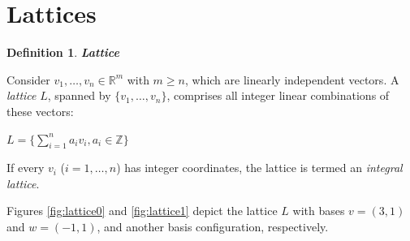\documentclass[a4paper,12pt]{report}
\newtheorem{definition}{Definition}[section]
\newcommand{\R}{\mathbb{R}}
\newcommand{\Z}{\mathbb{Z}}
\begin{document}
\section{Lattices}

\begin{definition}
    \textbf{Lattice}
\end{definition}

Consider $v_1, \ldots, v_n \in \R^m$ with $m \ge n$, which are linearly independent vectors. A \textit{lattice} $L$, spanned by $\{v_1, \ldots, v_n\}$, comprises all integer linear combinations of these vectors:

\begin{center}
    $L = \bigg\{\sum_{i=1}^{n} a_iv_i , a_i \in \Z \bigg\}$
\end{center}

If every $v_i$ ($i = 1, \ldots, n$) has integer coordinates, the lattice is termed an \textit{integral lattice}.

Figures \ref{fig:lattice0} and \ref{fig:lattice1} depict the lattice $L$ with bases $v=(3, 1)$ and $w=(-1, 1)$, and another basis configuration, respectively.
\end{document}
